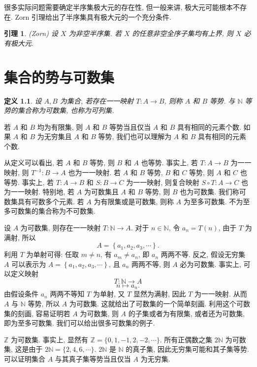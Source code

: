 \documentclass[openany]{ctexbook}
\theoremstyle{kaiti}
\newtheorem{definition}{定义}[section]
\newtheorem{lemma}{引理}[section]
\theoremstyle{normal}
\begin{document}
很多实际问题需要确定半序集极大元的存在性, 但一般来讲, 极大元可能根本不存在. Zorn 引理给出了半序集具有极大元的一个充分条件.

\begin{lemma}
(Zorn) 设 $X$ 为非空半序集. 若 $X$ 的任意非空全序子集均有上界, 则 $X$ 必有极大元.
\end{lemma}

\chapter{集合的势与可数集}

\begin{definition}
设 $A, B$ 为集合, 若存在一一映射 $T: A \rightarrow B$, 则称 $A$ 和 $B$ 等势. 与 $\mathbb{N}$ 等势的集合称为可数集, 也称为可列集.
\end{definition}

若 $A$ 和 $B$ 均为有限集, 则 $A$ 和 $B$ 等势当且仅当 $A$ 和 $B$ 具有相同的元素个数. 如果 $A$ 和 $B$ 为无穷集且 $A$ 和 $B$ 等势, 我们也可以理解为 $A$ 和 $B$ 具有相同的元素个数.

从定义可以看出, 若 $A$ 和 $B$ 等势, 则 $B$ 和 $A$ 也等势. 事实上, 若 $T: A \rightarrow B$ 为一一映射, 则 $T^{-1}: B \rightarrow A$ 也为一一映射. 若 $A$ 和 $B$ 等势, $B$ 和 $C$ 等势, 则 $A$ 和 $C$ 也等势. 事实上, 若 $T: A \rightarrow B$ 和 $S: B \rightarrow C$ 为一一映射, 则复合映射 $S\circ T: A \rightarrow C$ 也为一一映射. 特别地, 若 $A$ 为可数集且 $A$ 和 $B$ 等势, 则 $B$ 也为可数集. 我们称可数集具有可数多个元素. 若 $A$ 为有限集或是可数集, 则称 $A$ 为至多可数集. 不为至多可数集的集合称为不可数集.

设 $A$ 为可数集, 则存在一一映射 $T: \mathbb{N} \rightarrow A$. 对于 $n \in \mathbb{N}$, 令 $a_n=T(n)$, 由于 $T$ 为满射, 所以
$$
A=\left\{a_1, a_2, a_3, \cdots\right\}.
$$
利用 $T$ 为单射可得: 任取 $m \neq n$, 有 $a_m \neq a_n$, 即 $a_n$ 两两不等. 反之, 假设无穷集 $A$ 可以表示为 $A=\left\{a_1, a_2, a_3, \cdots\right\}$, 且 $a_n$ 两两不等, 则 $A$ 必为可数集. 事实上, 可以定义映射
$$
T: \mathbb{N} \rightarrow A
$$
$$
n \mapsto a_n.
$$
由假设条件 $a_n$ 两两不等知 $T$ 为单射, 又 $T$ 显然为满射, 因此 $T$ 为一一映射. 从而 $A$ 与 $\mathbb{N}$ 等势, 所以 $A$ 为可数集. 这就给出了可数集的一个简单刻画. 利用这个可数集的刻画, 容易证明若 $A$ 为可数集, 则 $A$ 的子集或者为有限集, 或者还为可数集, 即为至多可数集. 我们可以给出很多可数集的例子.

$\mathbb{Z}$ 为可数集. 事实上, 显然有 $\mathbb{Z}=\{0,1,-1,2,-2, \cdots\}$. 所有正偶数之集 $2 \mathbb{N}$ 为可数集, 这是由于 $2 \mathbb{N}=\{2,4,6, \cdots\}$. $2 \mathbb{N}$ 是 $\mathbb{N}$ 的真子集, 因此无穷集可能和其子集等势. 可以证明集合 $A$ 与其真子集等势当且仅当 $A$ 为无穷集.
\end{document}
